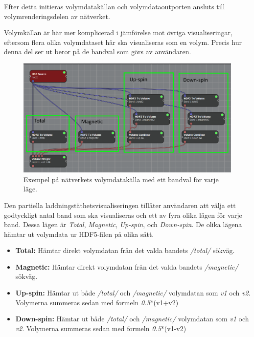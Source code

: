 \documentclass[10pt,oneside,swedish]{article}
\providecommand{\tightlist}{%
  \setlength{\itemsep}{0pt}\setlength{\parskip}{0pt}}
\begin{document}
Efter detta initieras volymdatakällan och volymdataoutporten ansluts
till volymrenderingsdelen av nätverket.

Volymkällan är här mer komplicerad i jämförelse mot övriga
visualiseringar, eftersom flera olika volymdataset här ska visualiseras
som en volym. Precis hur denna del ser ut beror på de bandval som görs
av användaren.

\begin{figure}[H]
\centering
\includegraphics[width=1.00000\textwidth]{Images/parchg_source_ex.png}
\caption{Exempel på nätverkets volymdatakälla med ett bandval för varje
läge.}
\end{figure}

Den partiella laddningstäthetsvisualiseringen tillåter användaren att
välja ett godtyckligt antal band som ska visualiseras och ett av fyra
olika lägen för varje band. Dessa lägen är \emph{Total},
\emph{Magnetic}, \emph{Up-spin}, och \emph{Down-spin}. De olika lägena
hämtar ut volymdata ur HDF5-filen på olika sätt.

\begin{itemize}
\tightlist
\item
  \textbf{Total:} Hämtar direkt volymdatan från det valda bandets
  \emph{/total/} sökväg.
\item
  \textbf{Magnetic:} Hämtar direkt volymdatan från det valda bandets
  \emph{/magnetic/} sökväg.
\item
  \textbf{Up-spin:} Hämtar ut både \emph{/total/} och \emph{/magnetic/}
  volymdatan som \emph{v1} och \emph{v2}. Volymerna summeras sedan med
  formeln \emph{0.5}*(v1+v2)
\item
  \textbf{Down-spin:} Hämtar ut både \emph{/total/} och
  \emph{/magnetic/} volymdatan som \emph{v1} och \emph{v2}. Volymerna
  summeras sedan med formeln \emph{0.5}*(v1-v2)
\end{itemize}
\end{document}
